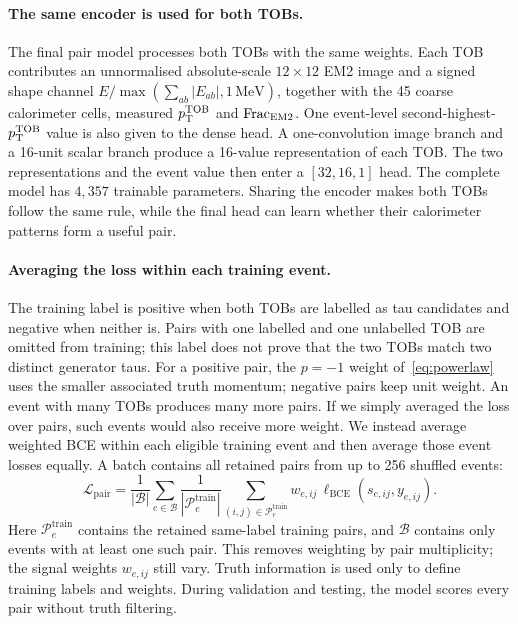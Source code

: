 \paragraph{The same encoder is used for both TOBs.}
The final pair model processes both TOBs with the same weights. Each TOB
contributes an unnormalised absolute-scale $12\times12$ EM2 image and a signed
shape channel $E/\max(\sum_{ab}|E_{ab}|,1\,\mathrm{MeV})$, together with the 45
coarse calorimeter cells, measured $p_{\mathrm{T}}^{\mathrm{TOB}}$ and $\mathrm{Frac}_{\mathrm{EM2}}$. One event-level
second-highest-$p_{\mathrm{T}}^{\mathrm{TOB}}$ value is also given to the dense head. A
one-convolution image branch and a 16-unit scalar branch produce a 16-value
representation of each TOB. The two representations and the event value then
enter a $[32,16,1]$ head. The complete model has $4{,}357$ trainable
parameters. Sharing the encoder makes both TOBs follow the same rule, while the
final head can learn whether their calorimeter patterns form a useful pair.

\paragraph{Averaging the loss within each training event.}
The training label is positive when both TOBs are labelled as tau candidates
and negative when neither is. Pairs with one labelled and one unlabelled TOB
are omitted from training; this label does not prove that the two TOBs match
two distinct generator taus. For a positive pair, the $p=-1$ weight
of~\eqref{eq:powerlaw} uses the smaller associated truth momentum; negative
pairs keep unit weight. An event with many TOBs produces many more pairs. If we
simply averaged the loss over pairs, such events would also receive more
weight. We instead average weighted BCE within each eligible training event and
then average those event losses equally. A batch contains all retained pairs from up to 256
shuffled events:
\begin{equation}
  \mathcal{L}_{\mathrm{pair}}
  = \frac{1}{|\mathcal{B}|}
    \sum_{e\in\mathcal{B}}
        \frac{1}{|\mathcal{P}^{\mathrm{train}}_e|}
    \sum_{(i,j)\in\mathcal{P}^{\mathrm{train}}_e}
    w_{e,ij}\,\ell_{\mathrm{BCE}}(s_{e,ij},y_{e,ij}).
  \label{eq:pair_event_loss}
\end{equation}
Here $\mathcal{P}^{\mathrm{train}}_e$ contains the retained same-label
training pairs, and $\mathcal B$ contains only events with at least one such
pair. This removes weighting by pair multiplicity; the signal weights
$w_{e,ij}$ still vary.
Truth information is used only to define training labels and weights. During
validation and testing, the model scores every pair without truth filtering.

